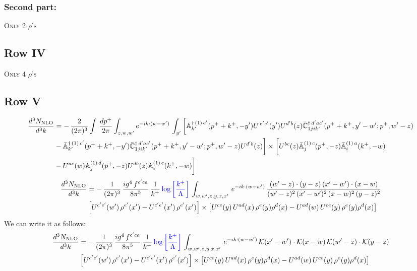 \documentclass[9pt]{article}
\def\mf#1{\mathbb{#1}}
\numberwithin{equation}{section}
\begin{document}
\subsubsection{Second part:}
\textsc{Only 2 $\rho$'s}
\subsection{Row IV}
\textsc{Only 4 $\rho$'s}
\subsection{Row V}
\begin{align}
 \frac{d^{3}N_{\rm NLO}}{d^{3}k} & =   -\,\frac{2}{(2\pi)^{3}} \int\, \frac{dp^{+}}{2\pi}\int_{z,w,w^{\prime}} e^{-ik\cdot (w-w')}\,\int_{y^{\prime}}\bigg[\mf{A}^{\dagger\, (1)\,e^{\prime}}_{k^{\prime}}(p^{+}+k^{+},-y^{\prime})U^{\, e^{\prime}c^{\prime}}(y^{\prime})U^{d^{\prime}b}(z) \Bar{\mf{C}}^{\dagger\, d^{\prime}ac^{\prime}}_{1jik^{\prime}}(p^{+}+k^{+},y^{\prime}-w^{\prime}; p^{+},w^{\prime}-z) \notag \\ & -\Bar{\mf{A}}^{\dagger\, (1)\,c^{\prime}}_{k^{\prime}}(p^{+}+k^{+},-y^{\prime}) \Bar{\mf{C}}^{\dagger\, d^{\prime}ac^{\prime}}_{1jik^{\prime}}(p^{+}+k^{+},y^{\prime}-w^{\prime}; p^{+},w^{\prime}-z)U^{d^{\prime}b}(z)\bigg] \times  \bigg[U^{bc}(z)\Bar{\mf{A}}^{(1)\, c}_{j}(p^{+},-z)\Bar{\mf{A}}^{(1)\, a}_{i}(k^{+},-w)\notag \\ & -U^{ac}(w) \Bar{\mf{A}}^{(1)\, d}_{j}(p^{+},-z)U^{db}(z) \mf{A}^{(1)\, c}_{i}(k^{+},- w)\bigg]\nonumber
\end{align}
\begin{align}
 \frac{d^{3}N_{\rm NLO}}{d^{3}k} & =    -\,\frac{1}{(2\pi)^{3}}\, \frac{ig^{4}\,f^{c'ca}}{8\pi^{5}}\, \frac{1}{k^{+}}\,{\color{blue}\log{\left[\frac{k^{+}}{\Lambda}\right]}}\, \int_{w,w',z,y,x,x'}\, e^{-ik\cdot (w-w')}\,\frac{(w'-z)\cdot (y-z)\,(x'-w')\cdot (x-w)}{(w'-z)^{2}\,(x'-w')^{2}\,(x-w)^{2}\,(y-z)^{2}}\notag \\ & \left[U^{c'e'}(w')\,\rho^{e'}(x')-U^{c'e'}(x')\,\rho^{e'}(x')\right]\times  \left[U^{ce}(y)\,U^{ad}(x)\,\rho^{e}(y)\rho^{d}(x)-U^{ad}(w)\,U^{ce}(y)\,\rho^{e}(y)\rho^{d}(x)\right]
\end{align}
We can write it as follows: 
\begin{align}
 \frac{d^{3}N_{\rm NLO}}{d^{3}k} & =    -\,\frac{1}{(2\pi)^{3}}\, \frac{ig^{4}\,f^{c'ca}}{8\pi^{5}}\, \frac{1}{k^{+}}\,{\color{blue}\log{\left[\frac{k^{+}}{\Lambda}\right]}}\, \int_{w,w',z,y,x,x'}\, e^{-ik\cdot (w-w')}\,\mathcal{K}(x'-w')\cdot \mathcal{K}(x-w)\,\mathcal{K}(w'-z)\cdot \mathcal{K}(y-z)\notag \\ & \left[U^{c'e'}(w')\,\rho^{e'}(x')-U^{c'e'}(x')\,\rho^{e'}(x')\right]\times  \left[U^{ce}(y)\,U^{ad}(x)\,\rho^{e}(y)\rho^{d}(x)-U^{ad}(w)\,U^{ce}(y)\,\rho^{e}(y)\rho^{d}(x)\right]
\end{align}
\end{document}
